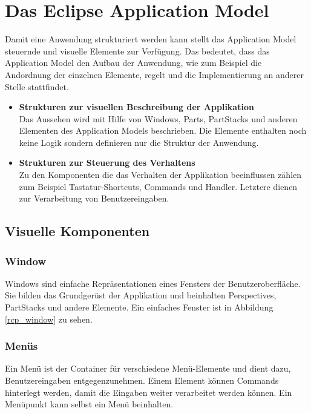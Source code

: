 \FloatBarrier
\section{Das Eclipse Application Model}

Damit eine Anwendung strukturiert werden kann stellt das Application Model steuernde und visuelle Elemente zur Verfügung. Das bedeutet, dass das Application Model den Aufbau der Anwendung, wie zum Beispiel die Andordnung der einzelnen Elemente, regelt und die Implementierung an anderer Stelle stattfindet.

\begin{itemize}

\item \textbf{Strukturen zur visuellen Beschreibung der Applikation}\\
	Das Aussehen wird mit Hilfe von Windows, Parts, PartStacks und anderen Elementen des Application Models beschrieben. Die Elemente enthalten noch keine Logik sondern definieren nur die Struktur der Anwendung.


\item \textbf{Strukturen zur Steuerung des Verhaltens}\\
	 Zu den Komponenten die das Verhalten der Applikation beeinflussen zählen zum Beispiel Tastatur-Shortcuts, Commands und Handler. Letztere dienen zur Verarbeitung von Benutzereingaben.

\end{itemize}

\FloatBarrier
\subsection{Visuelle Komponenten}

\subsubsection{Window}
Windows sind einfache Repräsentationen eines Fensters der Benutzeroberfläche\cite[org.eclipse.e4.ui.model.application.ui.basic]{eclipse:help}. Sie bilden das Grundgerüst der Applikation und beinhalten Perspectives, PartStacks und andere Elemente. Ein einfaches Fenster ist in Abbildung \ref{rcp_window} zu sehen.

\subsubsection{Menüs}
Ein Menü ist der Container für verschiedene Menü-Elemente und dient dazu, Benutzereingaben entgegenzunehmen. Einem Element können Commands hinterlegt werden, damit die Eingaben weiter verarbeitet werden können. Ein Menüpunkt kann selbst ein Menü beinhalten.

